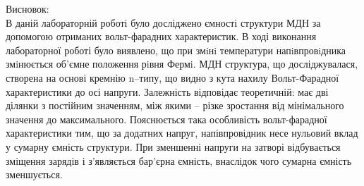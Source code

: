 \documentclass[a4paper,14pt]{extreport}
\begin{document}
\clearpage
Висновок: \\ 

	В даній лабораторній роботі було досліджено ємності структури МДН за допомогою отриманих вольт-фарадних характеристик. В ході виконання лабораторної роботі було виявлено, що при змiнi температури напiвпровiдника змiнюється об’ємне положення рiвня Фермi. МДН структура, що  досліджувалася, створена на основі кремнію n–типу, що видно з кута нахилу Вольт-Фарадної характеристики до осі напруги. Залежність відповідає теоретичній: має дві ділянки з постійним значенням, між якими – різке зростання від мінімального значення до максимального. Пояснюється така особливість вольт-фарадної характеристики тим, що за додатних напруг, напівпровідник несе нульовий вклад у сумарну ємність структури. При зменшенні напруги на затворі відбувається зміщення зарядів і з’являється бар'єрна ємність, внаслідок чого сумарна ємність зменшується.
\end{document}
